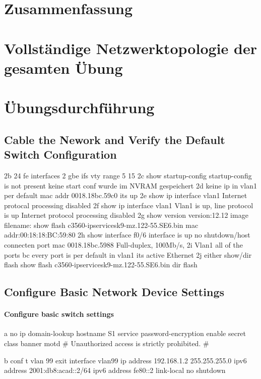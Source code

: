 \documentclass[a4paper]{article}
\begin{document}
\section{Zusammenfassung}

\newpage

\section{Vollständige Netzwerktopologie der gesamten Übung}

\newpage

\section{Übungsdurchführung}
\subsection{Cable the Nework and Verify the Default Switch Configuration}
2b
	24 fe interfaces
		2 gbe ifs
		vty range
			5 15
2c 
	show startup-config
	startup-config is not present
	keine start conf wurde im NVRAM gespeichert
2d 
	keine ip in vlan1 per default
	mac addr
	0018.18bc.59c0
	its up
2e	
	show ip interface vlan1
	Internet protocal processing disabled
2f
	show ip interface vlan1
	Vlan1 is up, line protocol is up
	Internet protocol processing disabled
2g
	show version
	version:12.12
	image filename:
	show flash
	c3560-ipservicesk9-mz.122-55.SE6.bin
	mac addr:00:18:18:BC:59:80
2h
	show interface f0/6
	interface is up
	no shutdown/host connecten
	port mac 0018.18bc.5988
	Full-duplex, 100Mb/s,
2i
	Vlan1
	all of the ports bc every port is per default in vlan1
	its active
	Ethernet
2j 
	either show/dir flash
	show flash
		c3560-ipservicesk9-mz.122-55.SE6.bin
	dir flash

\subsection{Configure Basic Network Device Settings}
\paragraph {Configure basic switch settings}

a
no ip domain-lookup
hostname S1
service password-encryption
enable secret class
banner motd \#
Unauthorized access is strictly prohibited. \#

b
conf t
vlan 99 
exit
interface vlan99
ip address 192.168.1.2 255.255.255.0
ipv6 address 2001:db8:acad::2/64
ipv6 address fe80::2 link-local
no shutdown
\end{document}
